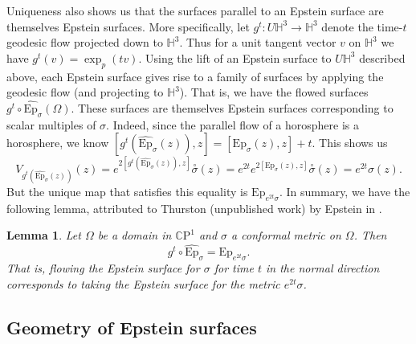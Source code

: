 \documentclass{amsart}
\newcommand{\CP}{\mathbb{C}\mathrm{P}}
\renewcommand{\H}{\mathbb{H}}
\newtheorem{lem}[thm]{Lemma}
\begin{document}
Uniqueness also shows us that the surfaces parallel to an Epstein surface are themselves Epstein surfaces. 
More specifically, let $g^t : U \H^3 \to \H^3$ denote the time-$t$ geodesic flow projected down to $\H^3$.
Thus for a unit tangent vector $v$ on $\H^3$ we have $g^t(v) = \exp_p(tv)$.
Using the lift of an Epstein surface to $U\H^3$ described above, each Epstein surface gives rise to a family of surfaces by applying the geodesic flow (and projecting to $\H^3$). 
That is, we have the flowed surfaces $g^t \circ \widehat{\mathrm{Ep}}_\sigma(\Omega)$. 
These surfaces are themselves Epstein surfaces corresponding to scalar multiples of $\sigma$. 
Indeed, since the parallel flow of a horosphere is a horosphere, we know $[g^t(\widehat{\mathrm{Ep}}_\sigma(z)),z] = [\mathrm{Ep}_\sigma(z),z] + t$. 
This shows us
\[
V_{g^t(\widehat{\mathrm{Ep}}_\sigma(z))}(z) = e^{2[g^t(\widehat{\mathrm{Ep}}_\sigma(z)),z]}\overset{\circ}{\sigma}(z) = e^{2t}e^{2[\mathrm{Ep}_\sigma(z),z]}\overset{\circ}{\sigma}(z) = e^{2t}\sigma(z).
\]
But the unique map that satisfies this equality is $\mathrm{Ep}_{e^{2t}\sigma}$. 
In summary, we have the following lemma, attributed to Thurston (unpublished work) by Epstein in \cite{epstein1984}.
\begin{lem}
\label{epstein-flow}
Let $\Omega$ be a domain in $\CP^1$ and $\sigma$ a conformal metric on $\Omega$.
Then 
\[
g^t \circ \widehat{\mathrm{Ep}}_\sigma  = \mathrm{Ep}_{e^{2t} \sigma}.
\]
That is, flowing the Epstein surface for $\sigma$ for time $t$ in the normal direction corresponds to taking the Epstein surface for the metric $e^{2t}\sigma$.
\end{lem}



\subsection{Geometry of Epstein surfaces}\label{epstein-geometry}
\end{document}
